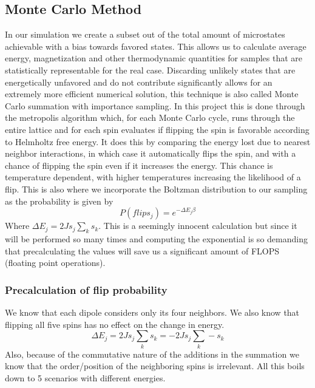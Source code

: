 \documentclass[a4paper, 12pt]{article}
\begin{document}
{\subsection{Monte Carlo Method}
	In our simulation we create a subset out of the total amount of microstates achievable with a bias towards favored states. This allows us to calculate average energy, magnetization and other thermodynamic quantities for samples that are statistically representable for the real case. Discarding unlikely states that are energetically unfavored and do not contribute significantly allows for an extremely more efficient numerical solution, this technique is also called Monte Carlo summation with importance sampling\cite[p~347]{schroeder}. In this project this is done through the metropolis algorithm which, for each Monte Carlo cycle, runs through the entire lattice and for each spin evaluates if flipping the spin is favorable according to Helmholtz free energy. It does this by comparing the energy lost due to nearest neighbor interactions, in which case it automatically flips the spin, and with a chance of flipping the spin even if it increases the energy. This chance is temperature dependent, with higher temperatures increasing the likelihood of a flip. This is also where we incorporate the Boltzman distribution to our sampling as the probability is given by
	\begin{equation*}
		P(flip s_j) = e^{- \Delta E_j \beta }
	\end{equation*}
	Where $\Delta E_j = 2Js_j\sum_k s_k$.
	This is a seemingly innocent calculation but since it will be performed so many times and  computing the exponential is so demanding that precalculating the values will save us a significant amount of FLOPS (floating point operations).
	\subsubsection{Precalculation of flip probability}
		We know that each dipole considers only its four neighbors. We also know that flipping all five spins has no effect on the change in energy. 
		\begin{equation*}
			\Delta E_j =  2Js_j\sum_k s_k =  -2Js_j\sum_k -s_k
		\end{equation*}
		Also, because of the commutative nature of the additions in the summation we know that the order/position of the neighboring spins is irrelevant. All this boils down to 5 scenarios with different energies.
		
}
\end{document}
